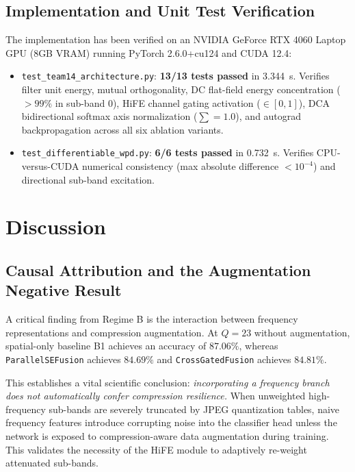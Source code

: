 \documentclass[11pt,a4paper]{article}
\begin{document}
\subsection{Implementation and Unit Test Verification}
The implementation has been verified on an NVIDIA GeForce RTX 4060 Laptop GPU (8GB VRAM) running PyTorch 2.6.0+cu124 and CUDA 12.4:
\begin{itemize}
    \item \texttt{test\_team14\_architecture.py}: \textbf{13/13 tests passed} in 3.344~s. Verifies filter unit energy, mutual orthogonality, DC flat-field energy concentration ($>99\%$ in sub-band 0), HiFE channel gating activation ($\in [0, 1]$), DCA bidirectional softmax axis normalization ($\sum = 1.0$), and autograd backpropagation across all six ablation variants.
    \item \texttt{test\_differentiable\_wpd.py}: \textbf{6/6 tests passed} in 0.732~s. Verifies CPU-versus-CUDA numerical consistency (max absolute difference $< 10^{-4}$) and directional sub-band excitation.
\end{itemize}

\section{Discussion}
\label{sec:discussion}

\subsection{Causal Attribution and the Augmentation Negative Result}
A critical finding from Regime B is the interaction between frequency representations and compression augmentation. At $Q=23$ without augmentation, spatial-only baseline B1 achieves an accuracy of $87.06\%$, whereas \texttt{ParallelSEFusion} achieves $84.69\%$ and \texttt{CrossGatedFusion} achieves $84.81\%$. 

This establishes a vital scientific conclusion: \textit{incorporating a frequency branch does not automatically confer compression resilience.} When unweighted high-frequency sub-bands are severely truncated by JPEG quantization tables, naive frequency features introduce corrupting noise into the classifier head unless the network is exposed to compression-aware data augmentation during training. This validates the necessity of the HiFE module to adaptively re-weight attenuated sub-bands.
\end{document}
